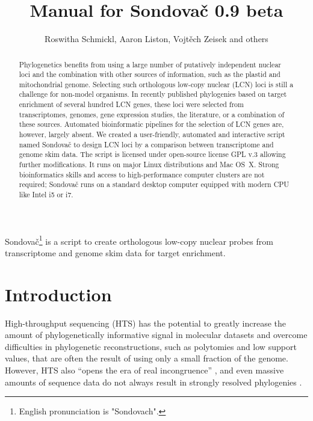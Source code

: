 \documentclass[a4paper, 11pt, twoside]{article}
\title{Manual for Sondovač 0.9 beta}
\author{Roswitha Schmickl, Aaron Liston, Vojtěch Zeisek and others}
\begin{document}
\maketitle
Sondovač\footnote{English pronunciation is "Sondovach".} is a script to create orthologous low-copy nuclear probes from transcriptome and genome skim data for target enrichment.

\begin{abstract}
Phylogenetics benefits from using a large number of putatively independent nuclear loci and the combination with other sources of information, such as the plastid and mitochondrial genome. Selecting such orthologous low-copy nuclear (LCN) loci is still a challenge for non-model organisms. In recently published phylogenies based on target enrichment of several hundred LCN genes, these loci were selected from transcriptomes, genomes, gene expression studies, the literature, or a combination of these sources. Automated bioinformatic pipelines for the selection of LCN genes are, however, largely absent. We created a user-friendly, automated and interactive script named Sondovač to design LCN loci by a comparison between transcriptome and genome skim data. The script is licensed under open-source license GPL v.3 allowing further modifications. It runs on major Linux distributions and Mac OS~X. Strong bioinformatics skills and access to high-performance computer clusters are not required; Sondovač runs on a standard desktop computer equipped with modern CPU like Intel i5 or i7.
\end{abstract}

\tableofcontents
\listoffigures
\listoftables
\vskip 1cm



\section{Introduction}

High-throughput sequencing (HTS) has the potential to greatly increase the amount of phylogenetically informative signal in molecular datasets \citep{Parks2009, Parks2012} and overcome difficulties in phylogenetic reconstructions, such as polytomies and low support values, that are often the result of using only a small fraction of the genome. However, HTS also “opens the era of real incongruence” \citep{Jeffroy2006}, and even massive amounts of sequence data do not always result in strongly resolved phylogenies \citep{Pyron2015}.
\end{document}
